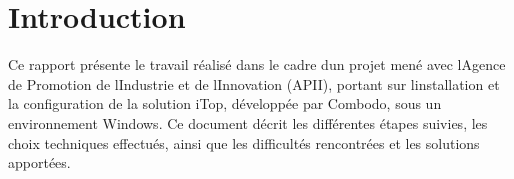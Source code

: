 \chapter*{Introduction}

Ce rapport présente le travail réalisé dans le cadre d\textquotesingle un projet mené avec l\textquotesingle Agence de Promotion de l\textquotesingle Industrie et de l\textquotesingle Innovation (APII), portant sur l\textquotesingle installation et la configuration de la solution iTop, développée par Combodo, sous un environnement Windows. Ce document décrit les différentes étapes suivies, les choix techniques effectués, ainsi que les difficultés rencontrées et les solutions apportées.


